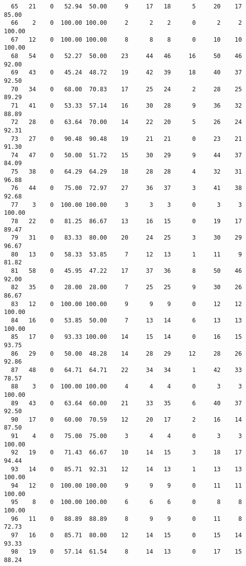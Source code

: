 \begin{verbatim}
  65   21    0   52.94  50.00     9     17   18      5     20    17    85.00
  66    2    0  100.00 100.00     2      2    2      0      2     2   100.00
  67   12    0  100.00 100.00     8      8    8      0     10    10   100.00
  68   54    0   52.27  50.00    23     44   46     16     50    46    92.00
  69   43    0   45.24  48.72    19     42   39     18     40    37    92.50
  70   34    0   68.00  70.83    17     25   24      2     28    25    89.29
  71   41    0   53.33  57.14    16     30   28      9     36    32    88.89
  72   28    0   63.64  70.00    14     22   20      5     26    24    92.31
  73   27    0   90.48  90.48    19     21   21      0     23    21    91.30
  74   47    0   50.00  51.72    15     30   29      9     44    37    84.09
  75   38    0   64.29  64.29    18     28   28      4     32    31    96.88
  76   44    0   75.00  72.97    27     36   37      3     41    38    92.68
  77    3    0  100.00 100.00     3      3    3      0      3     3   100.00
  78   22    0   81.25  86.67    13     16   15      0     19    17    89.47
  79   31    0   83.33  80.00    20     24   25      3     30    29    96.67
  80   13    0   58.33  53.85     7     12   13      1     11     9    81.82
  81   58    0   45.95  47.22    17     37   36      8     50    46    92.00
  82   35    0   28.00  28.00     7     25   25      9     30    26    86.67
  83   12    0  100.00 100.00     9      9    9      0     12    12   100.00
  84   16    0   53.85  50.00     7     13   14      6     13    13   100.00
  85   17    0   93.33 100.00    14     15   14      0     16    15    93.75
  86   29    0   50.00  48.28    14     28   29     12     28    26    92.86
  87   48    0   64.71  64.71    22     34   34      1     42    33    78.57
  88    3    0  100.00 100.00     4      4    4      0      3     3   100.00
  89   43    0   63.64  60.00    21     33   35      6     40    37    92.50
  90   17    0   60.00  70.59    12     20   17      2     16    14    87.50
  91    4    0   75.00  75.00     3      4    4      0      3     3   100.00
  92   19    0   71.43  66.67    10     14   15      3     18    17    94.44
  93   14    0   85.71  92.31    12     14   13      1     13    13   100.00
  94   12    0  100.00 100.00     9      9    9      0     11    11   100.00
  95    8    0  100.00 100.00     6      6    6      0      8     8   100.00
  96   11    0   88.89  88.89     8      9    9      0     11     8    72.73
  97   16    0   85.71  80.00    12     14   15      0     15    14    93.33
  98   19    0   57.14  61.54     8     14   13      0     17    15    88.24

\end{verbatim}
